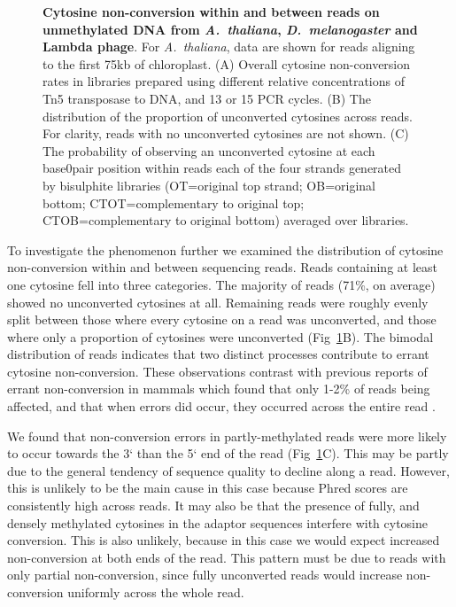 \documentclass[10pt,draft,letterpaper]{article}
\begin{document}
\begin{figure}
    \caption{
        {\bf Cytosine non-conversion within and between reads on unmethylated DNA from \textit{A.~thaliana}, \textit{D.~melanogaster} and Lambda phage}.
        For \textit{A.~thaliana}, data are shown for reads aligning to the first 75kb of chloroplast.
        (A) Overall cytosine non-conversion rates in libraries prepared using different relative concentrations of Tn5 transposase to DNA, and 13 or 15 PCR cycles.
        (B) The distribution of the proportion of unconverted cytosines across reads. For clarity, reads with no unconverted cytosines are not shown.
        (C) The probability of observing an unconverted cytosine at each base0pair position within reads each of the four strands generated by bisulphite libraries (OT=original top strand; OB=original bottom; CTOT=complementary to original top; CTOB=complementary to original bottom) averaged over libraries.
    }
    \label{fig:reads}
\end{figure}

To investigate the phenomenon further we examined the distribution of cytosine non-conversion within and between sequencing reads.
Reads containing at least one cytosine fell into three categories.
The majority of reads (71\%, on average) showed no unconverted cytosines at all.
Remaining reads were roughly evenly split between those where every cytosine on a read was unconverted, and those where only a proportion of cytosines were unconverted (Fig~\ref{fig:reads}B).
The bimodal distribution of reads indicates that two distinct processes contribute to errant cytosine non-conversion.
These observations contrast with previous reports of errant non-conversion in mammals which found that only 1-2\% of reads being affected, and that when errors did occur, they occurred across the entire read \cite{lu2015improved, suzuki2018whole}.

We found that non-conversion errors in partly-methylated reads were more likely to occur towards the 3` than the 5` end of the read (Fig~\ref{fig:reads}C).
This may be partly due to the general tendency of sequence quality to decline along a read.
However, this is unlikely to be the main cause in this case because Phred scores are consistently high across reads.
It may also be that the presence of fully, and densely methylated cytosines in the adaptor sequences interfere with cytosine conversion.
This is also unlikely, because in this case we would expect increased non-conversion at both ends of the read.
This pattern must be due to reads with only partial non-conversion, since fully unconverted reads would increase non-conversion uniformly across the whole read.
\end{document}
